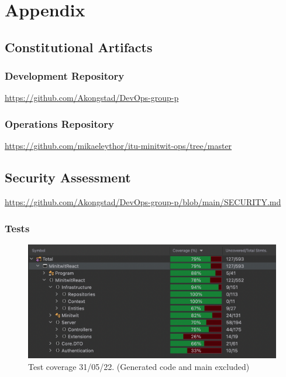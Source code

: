 \section{Appendix}
\label{app}

\subsection{Constitutional Artifacts}
\label{app:constArts}

\subsubsection{Development Repository}
\label{app:devRepo}
\href{https://github.com/Akongstad/DevOps-group-p}{https://github.com/Akongstad/DevOps-group-p}

\subsubsection{Operations Repository}
\label{app:opsRepo}
\href{https://github.com/mikaeleythor/itu-minitwit-ops/tree/master}{https://github.com/mikaeleythor/itu-minitwit-ops/tree/master}

\subsection{Security Assessment}
\label{app:secAss}
\href{https://github.com/Akongstad/DevOps-group-p/blob/main/SECURITY.md}{https://github.com/Akongstad/DevOps-group-p/blob/main/SECURITY.md}

\subsubsection{Tests}
\label{app:testSuite}
\begin {figure}[H]
    \centering
    \includegraphics[scale=0.42]{images/testCoverage.png}
    \caption{Test coverage 31/05/22. (Generated code and main excluded)}
    \label{fig:testCov}
\end{figure}


